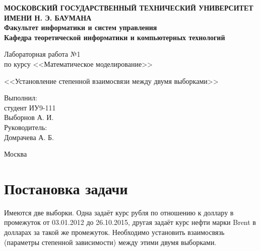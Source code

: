 \documentclass[12pt,a4paper,oneside]{extarticle}
\begin{document}
\pgfplotsset{compat=1.8}

\thispagestyle{empty}
\newpage
{
\centering


\textbf{
МОСКОВСКИЙ ГОСУДАРСТВЕННЫЙ ТЕХНИЧЕСКИЙ УНИВЕРСИТЕТ ИМЕНИ Н. Э. БАУМАНА \\
Факультет информатики и систем управления \\
Кафедра теоретической информатики и компьютерных технологий}
\bigskip
\bigskip
\bigskip
\bigskip
\bigskip
\bigskip
\bigskip

\vfill


Лабораторная работа №1 \\
по курсу <<Математическое моделирование>>

\bigskip

{\large <<Установление степенной взаимосвязи между двумя выборками>>}
\bigskip

\vfill



\hfill\parbox{4cm} {
Выполнил:\\
студент ИУ9-111 \hfill \\
Выборнов А. И.\hfill \medskip\\
Руководитель:\\
Домрачева А. Б.\hfill
}


\vspace{\fill}

Москва \number\year
\clearpage
}



\clearpage


\section{Постановка задачи}
    Имеются две выборки. Одна задаёт курс рубля по отношению к доллару в промежуток от 03.01.2012 до 26.10.2015, другая задаёт курс нефти марки Brent в долларах за такой же промежуток. Необходимо установить взаимосвязь (параметры степенной зависимости) между этими двумя выборками.
\end{document}
